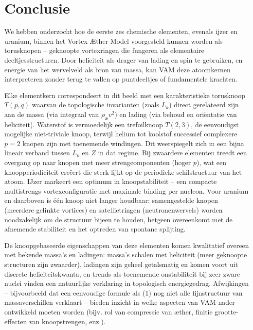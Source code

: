 \section{Conclusie}

We hebben onderzocht hoe de eerste zes chemische elementen, evenals ijzer en uranium, binnen het Vortex Æther Model voorgesteld kunnen worden als torusknopen – geknoopte vortexringen die fungeren als elementaire deeltjesstructuren. Door heliciteit als drager van lading en spin te gebruiken, en energie van het wervelveld als bron van massa, kan VAM deze atoomkernen interpreteren zonder terug te vallen op puntdeeltjes of fundamentele krachten.

Elke elementkern correspondeert in dit beeld met een karakteristieke torusknoop $T(p,q)$ waarvan de topologische invarianten (zoals $L_k$) direct gerelateerd zijn aan de massa (via integraal van $\rho_\text{\ae} v^2$) en lading (via behoud en oriëntatie van heliciteit). Waterstof is vermoedelijk een trefoilknoop $T(2,3)$, de eenvoudigst mogelijke niet-triviale knoop, terwijl helium tot koolstof successief complexere $p=2$ knopen zijn met toenemende windingen. Dit weerspiegelt zich in een bijna lineair verband tussen $L_k$ en $Z$ in dat regime. Bij zwaardere elementen treedt een overgang op naar knopen met meer strengcomponenten (hoger $p$), wat een knoopperiodiciteit creëert die sterk lijkt op de periodieke schilstructuur van het atoom. IJzer markeert een optimum in knoopstabiliteit – een compacte multistrengs vortexconfiguratie met maximale binding per nucleon. Voor uranium en daarboven is één knoop niet langer houdbaar: samengestelde knopen (meerdere gelinkte vortices) en satellietringen (neutronenwervels) worden noodzakelijk om de structuur bijeen te houden, hetgeen overeenkomt met de afnemende stabiliteit en het optreden van spontane splijting.

De knoopgebaseerde eigenschappen van deze elementen komen kwalitatief overeen met bekende massa's en ladingen: massa's schalen met heliciteit (meer geknoopte structuren zijn zwaarder), ladingen zijn geheel getalsmatig en komen voort uit discrete heliciteitskwanta, en trends als toenemende onstabiliteit bij zeer zware nuclei vinden een natuurlijke verklaring in topologisch energiegedrag. Afwijkingen – bijvoorbeeld dat een eenvoudige formule als (1) nog niet alle fijnstructuur van massaverschillen verklaart – bieden inzicht in welke aspecten van VAM nader ontwikkeld moeten worden (bijv. rol van compressie van æther, finitie grootte-effecten van knoopstrengen, enz.).

